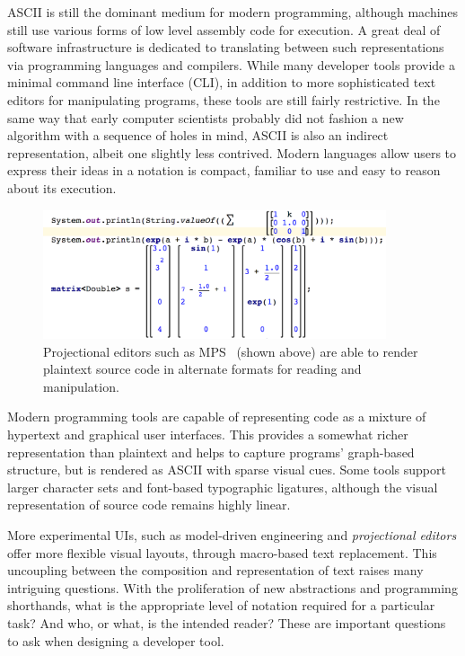 \documentclass[12pt,initial,twoside,maitrise]{dms}
\numberwithin{equation}{section}
\numberwithin{table}{chapter}
\numberwithin{figure}{chapter}
\begin{document}
ASCII is still the dominant medium for modern programming, although machines still use various forms of low level assembly code for execution. A great deal of software infrastructure is dedicated to translating between such representations via programming languages and compilers. While many developer tools provide a minimal command line interface (CLI), in addition to more sophisticated text editors for manipulating programs, these tools are still fairly restrictive. In the same way that early computer scientists probably did not fashion a new algorithm with a sequence of holes in mind, ASCII is also an indirect representation, albeit one slightly less contrived. Modern languages allow users to express their ideas in a notation is compact, familiar to use and easy to reason about its execution.

\begin{figure}
    \centering
    \includegraphics[width=0.90\textwidth]{mps_screenshot.png}
    \caption{Projectional editors such as MPS~\citep{voelter2010language} (shown above)  are able to render plaintext source code in alternate formats for reading and manipulation.}
    \label{fig:mps_screenshot}
\end{figure}

Modern programming tools are capable of representing code as a mixture of hypertext and graphical user interfaces. This provides a somewhat richer representation than plaintext and helps to capture programs' graph-based structure, but is rendered as ASCII with sparse visual cues. Some tools support larger character sets and font-based typographic ligatures, although the visual representation of source code remains highly linear.

More experimental UIs, such as model-driven engineering and \textit{projectional editors} offer more flexible visual layouts, through macro-based text replacement. This uncoupling between the composition and representation of text raises many intriguing questions. With the proliferation of new abstractions and programming shorthands, what is the appropriate level of notation required for a particular task? And who, or what, is the intended reader? These are important questions to ask when designing a developer tool.
\end{document}
